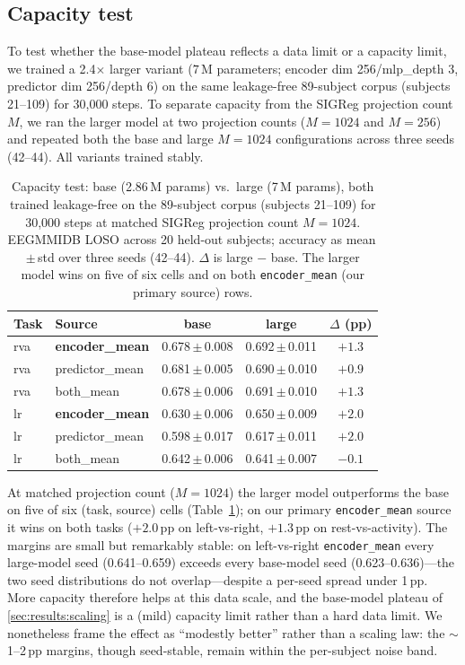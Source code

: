 \subsection{Capacity test}
\label{sec:results:capacity}

To test whether the base-model plateau reflects a data limit or a capacity
limit, we trained a 2.4$\times$ larger variant ($7$\,M parameters; encoder
dim 256/mlp\_depth 3, predictor dim 256/depth 6) on the same leakage-free
89-subject corpus (subjects 21--109) for 30{,}000 steps. To separate
capacity from the SIGReg projection count $M$, we ran the larger model at
two projection counts ($M{=}1024$ and $M{=}256$) and repeated both the base
and large $M{=}1024$ configurations across three seeds (42--44). All
variants trained stably.

\begin{table}[t]
\caption{Capacity test: base (2.86\,M params) vs.\ large (7\,M params),
both trained leakage-free on the 89-subject corpus (subjects 21--109) for
30{,}000 steps at matched SIGReg projection count $M{=}1024$. EEGMMIDB LOSO
across 20 held-out subjects; accuracy as mean\,$\pm$\,std over three seeds
(42--44). $\Delta$ is large $-$ base. The larger model wins on five of six
cells and on both \texttt{encoder\_mean} (our primary source) rows.}
\label{tab:capacity}
\centering
\small
\begin{tabular}{l l c c c}
\toprule
Task & Source & base & large & $\Delta$ (pp) \\
\midrule
rva & \textbf{encoder\_mean}   & 0.678\,$\pm$\,0.008 & 0.692\,$\pm$\,0.011 & $+1.3$  \\
rva & predictor\_mean & 0.681\,$\pm$\,0.005 & 0.690\,$\pm$\,0.010 & $+0.9$  \\
rva & both\_mean      & 0.678\,$\pm$\,0.006 & 0.691\,$\pm$\,0.010 & $+1.3$  \\
\midrule
lr  & \textbf{encoder\_mean}   & 0.630\,$\pm$\,0.006 & 0.650\,$\pm$\,0.009 & $+2.0$  \\
lr  & predictor\_mean & 0.598\,$\pm$\,0.017 & 0.617\,$\pm$\,0.011 & $+2.0$  \\
lr  & both\_mean      & 0.642\,$\pm$\,0.006 & 0.641\,$\pm$\,0.007 & $-0.1$  \\
\bottomrule
\end{tabular}
\end{table}

At matched projection count ($M{=}1024$) the larger model outperforms the
base on five of six (task, source) cells (Table~\ref{tab:capacity}); on our
primary \texttt{encoder\_mean} source it wins on both tasks ($+2.0$\,pp on
left-vs-right, $+1.3$\,pp on rest-vs-activity). The margins are small but
remarkably stable: on left-vs-right \texttt{encoder\_mean} every large-model
seed (0.641--0.659) exceeds every base-model seed (0.623--0.636)---the two
seed distributions do not overlap---despite a per-seed spread under 1\,pp.
More capacity therefore helps at this data scale, and the base-model plateau
of \cref{sec:results:scaling} is a (mild) capacity limit rather than a hard
data limit. We nonetheless frame the effect as ``modestly better'' rather
than a scaling law: the $\sim$1--2\,pp margins, though seed-stable, remain
within the per-subject noise band.

